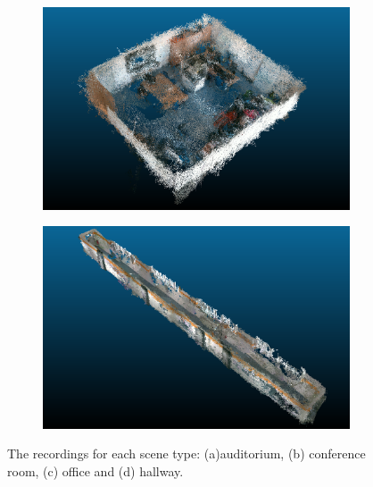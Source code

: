 \documentclass[main.tex]{subfiles}
\begin{document}
\begin{figure}[H]
    \begin{subfigure}{0.5\textwidth}
        \centering
        \includegraphics[width=0.9\linewidth]{images/425.png}
        \caption[Dynamic Dataset office]{}
        \label{fig:fin425}
    \end{subfigure}
    \begin{subfigure}{0.5\textwidth}
        \centering
        \includegraphics[width=0.9\linewidth]{images/hallway.png}
        \caption[Dynamic Dataset office]{}
        \label{fig:finhw}
    \end{subfigure}
    \caption[Dynamic Datasets]{The recordings for each scene type: (a)auditorium, (b) conference room, (c) office and (d) hallway.}
    \label{fig:fin}
\end{figure}
\end{document}
